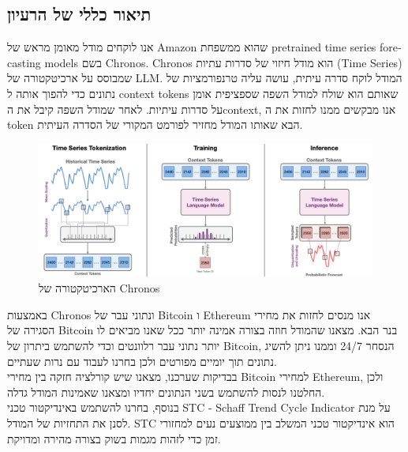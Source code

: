 \documentclass[a4paper,11pt]{article}
\title{\te{Chronos: Learning the Language of Time Series}}
\author{מתן לבינטוב \and יובל שוורץ \and גבריאל מגידוב \and שי קרנצברג}
\date{}
\newcommand{\te}[1]{\textenglish{#1}}
\begin{document}
\begin{RTL}
    
\maketitle
\section{תיאור כללי של הרעיון}
אנו לוקחים מודל מאומן מראש של \te{Amazon} שהוא ממשפחת \te{pretrained time series forecasting models} בשם \te{Chronos}. \te{Chronos} הוא מודל חיזוי של סדרות עתיות (\te{Time Series}) שמבוסס על ארכיטקטורה של \te{LLM}. המודל לוקח סדרה עיתית, עושה עליה טרנפורמציות של נתונים כדי להפוך אותה ל \te{context tokens} שאותם הוא שולח למודל השפה שספציפית אומן על סדרות עיתיות. לאחר שמודל השפה קיבל את ה\te{context}, אנו מבקשים ממנו לחזות את ה \te{token} הבא שאותו המודל מחזיר לפורמט המקורי של הסדרה העיתית.
\begin{figure}[H]
    \centering
    \includegraphics[width=1\textwidth]{Chronos Pretrained Model.png}
    \caption{הארכיטקטורה של \te{Chronos}}
\end{figure}
באמצעות \te{Chronos} ונתוני עבר של \te{Bitcoin} ו \te{Ethereum} אנו מנסים לחזות את מחירי הסגירה של \te{Bitcoin} בנר הבא. מצאנו שהמודל חוזה בצורה אמינה יותר ככל שאנו מביאים לו יותר נתוני עבר רלוונטים וכדי להשתמש ביתרון של \te{Bitcoin}, הנסחר 24/7 וממנו ניתן להשיג נתונים תוך יומיים מפורטים ולכן בחרנו לעבוד עם נרות שעתיים.
\\
בבדיקות שערכנו, מצאנו שיש קורלציה חזקה בין מחירי \te{Bitcoin} למחירי \te{Ethereum}, ולכן החלטנו לנסות להשתמש בשני הנתונים יחדיו ומצאנו שאמינות המודל גדלה.
\\
בנוסף, בחרנו להשתמש באינדיקטור טכני \textenglish{STC - Schaff Trend Cycle Indicator} על מנת לסנן את התחזיות של המודל. \te{STC} הוא אינדיקטור טכני המשלב בין ממוצעים נעים למחזורי זמן כדי לזהות מגמות בשוק בצורה מהירה ומדויקת.
\newpage

\end{RTL}
\end{document}
